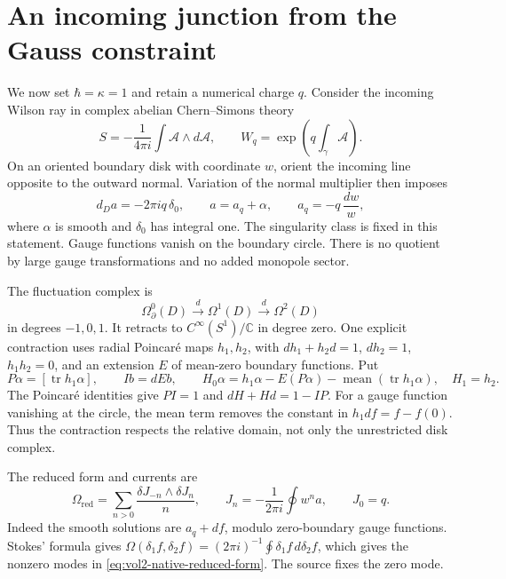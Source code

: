 \section{An incoming junction from the Gauss constraint}

We now set \(\hbar=\kappa=1\) and retain a numerical charge \(q\).
Consider the incoming Wilson ray in complex abelian Chern--Simons theory
\[
 S=-\frac1{4\pi i}\int\mathcal A\wedge d\mathcal A,
 \qquad W_q=\exp\left(q\int_\gamma\mathcal A\right).
\]
On an oriented boundary disk with coordinate \(w\), orient the incoming
line opposite to the outward normal. Variation of the normal multiplier
then imposes
\begin{equation}\label{eq:vol2-native-gauss}
 d_Da=-2\pi iq\,\delta_0,
 \qquad a=a_q+\alpha,
 \qquad a_q=-q\,\frac{dw}{w},
\end{equation}
where \(\alpha\) is smooth and \(\delta_0\) has integral one.
The singularity class is fixed in this statement. Gauge functions vanish
on the boundary circle. There is no quotient by large gauge
transformations and no added monopole sector.

The fluctuation complex is
\[
 \Omega^0_\partial(D)\xrightarrow{d}\Omega^1(D)
                               \xrightarrow{d}\Omega^2(D)
\]
in degrees \(-1,0,1\). It retracts to
\(C^\infty(S^1)/\mathbb C\) in degree zero. One explicit contraction uses
radial Poincar\'e maps \(h_1,h_2\), with
\(dh_1+h_2d=1\), \(dh_2=1\), \(h_1h_2=0\), and an extension \(E\) of
mean-zero boundary functions. Put
\[
 P\alpha=[\operatorname{tr}h_1\alpha],\qquad Ib=dEb,
 \qquad
 H_0\alpha=h_1\alpha-E(P\alpha)
                    -\operatorname{mean}(\operatorname{tr}h_1\alpha),
 \quad H_1=h_2.
\]
The Poincar\'e identities give \(PI=1\) and \(dH+Hd=1-IP\).
For a gauge function vanishing at the circle, the mean term removes the
constant in \(h_1df=f-f(0)\). Thus the contraction respects the relative
domain, not only the unrestricted disk complex.

The reduced form and currents are
\begin{equation}\label{eq:vol2-native-reduced-form}
 \Omega_{\mathrm{red}}
      =\sum_{n>0}\frac{\delta J_{-n}\wedge\delta J_n}{n},
 \qquad J_n=-\frac1{2\pi i}\oint w^na,
 \qquad J_0=q.
\end{equation}
Indeed the smooth solutions are \(a_q+df\), modulo zero-boundary gauge
functions. Stokes' formula gives
\(\Omega(\delta_1f,\delta_2f)
=(2\pi i)^{-1}\oint\delta_1f\,d\delta_2f\), which gives the nonzero
modes in \eqref{eq:vol2-native-reduced-form}. The source fixes the zero mode.

